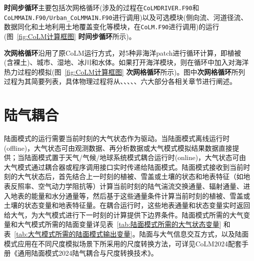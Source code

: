 \textbf{时间步循环}主要包括次网格循环(涉及的过程在\texttt{CoLMDRIVER.F90}和\texttt{CoLMMAIN.F90\allowbreak /Urban\allowbreak \_CoLMMAIN.F90}进行调用)以及可选模块(侧向流、河道径流、数据同化和土地利用土地覆盖变化等模块，在\texttt{CoLM.F90}进行调用)的运行(图~\ref{fig:CoLM计算框图} \textbf{时间步循环}所示)。

\textbf{次网格循环}沿用了原CoLM运行方式，对5种非海洋patch进行循环计算，即植被(含裸土)、城市、湿地、冰川和水体。如果打开海洋模块，则在循环中加入对海洋热力过程的模拟(图~\ref{fig:CoLM计算框图} \textbf{次网格循环}所示)。图中\textbf{次网格循环}所列过程为其简要列表，具体物理过程将从、、、、、六大部分各相关章节进行阐述。

\section{陆气耦合}\label{陆气耦合}

陆面模式的运行需要当前时刻的大气状态作为驱动。当陆面模式离线运行时(offline)，大气状态可由观测数据、再分析数据或大气模式模拟结果数据直接提供；当陆面模式置于天气/气候/地球系统模式耦合运行时(online)，大气状态可由大气模式通过耦合器或程序调用接口实时传递给陆面模式。陆面模式接收到当前时刻的大气状态后，首先结合上一时刻的植被、雪盖或土壤的状态和地表特征（如地表反照率、空气动力学阻抗等）计算当前时刻的陆气湍流交换通量、辐射通量、进入地表的能量和水分通量等，然后基于这些通量条件计算当前时刻的植被、雪盖或土壤的状态变量和地表特征量。在耦合运行时，这些地表通量和状态变量实时返回给大气，为大气模式进行下一时刻的计算提供下边界条件。陆面模式所需的大气变量和大气模式所需的陆面变量详见表~\ref{tab:陆面模式所需的大气状态变量} 和表~\ref{tab:大气模式所需的陆面模式输出变量}。陆面与大气信息交互方式，以及陆面模式应用在不同尺度模拟场景下所采用的尺度转换方法，可详见CoLM2024配套手册《通用陆面模式2024陆气耦合与尺度转换技术》。

